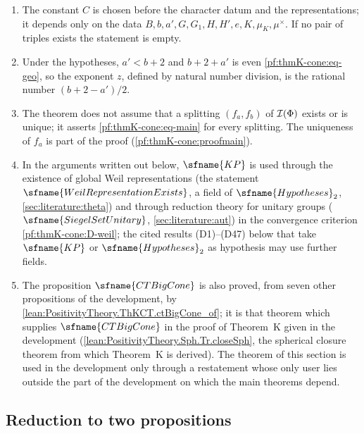 \begin{remark}\label{pf:thmK-cone:rem-statement}
\begin{enumerate}
\item The constant $C$ is chosen before the character datum and the representations; it depends only on the data
  $B,b,a',G,G_1,H,H',e,K,\mu_K,\mu^\times$.  If no pair of triples exists the statement is empty.
\item Under the hypotheses, $a'<b+2$ and $b+2+a'$ is even \eqref{pf:thmK-cone:eq-geo}, so the exponent $z$, defined by
  natural number division, is the rational number $(b+2-a')/2$.
\item The theorem does not assume that a splitting $(f_a,f_b)$ of $\mathcal{I}(\Phi)$ exists or is unique; it asserts
  \eqref{pf:thmK-cone:eq-main} for every splitting.  The uniqueness of $f_a$ is part of the proof
  (\cref{pf:thmK-cone:proofmain}).
\item In the arguments written out below, $\sfname{KP}$ is used through the existence of global Weil representations (the
  statement $\sfname{WeilRepresentationExists}$, a field of $\sfname{Hypotheses}_2$, \cref{sec:literature:theta}) and
  through reduction theory for unitary groups ($\sfname{SiegelSetUnitary}$, \cref{sec:literature:aut}) in the convergence
  criterion \ref{pf:thmK-cone:D-weil}; the cited results \textup{(D1)}--\textup{(D47)} below that take $\sfname{KP}$ or
  $\sfname{Hypotheses}_2$ as hypothesis may use further fields.
\item The proposition $\sfname{CTBigCone}$ is also proved, from seven other propositions of the development, by
  \cref{lean:PositivityTheory.ThKCT.ctBigCone_of}; it is that theorem which supplies $\sfname{CTBigCone}$ in the proof of
  Theorem~K given in the development (\cref{lean:PositivityTheory.Sph.Tr.closeSph}, the spherical closure theorem from
  which Theorem~K is derived).  The theorem of this section is used in the development only through a restatement whose
  only user lies outside the part of the development on which the main theorems depend.
\end{enumerate}
\end{remark}


\subsection{Reduction to two propositions}\label{pf:thmK-cone:reduction}

